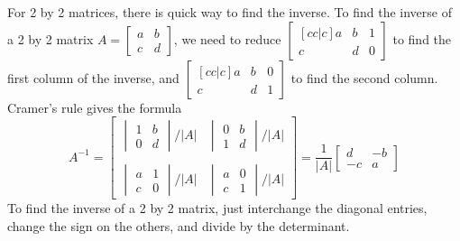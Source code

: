 For 2 by 2 matrices, there is quick way to find the inverse. 
To find the inverse of a 2 by 2 matrix $A=\begin{bmatrix}a&b\\c&d\end{bmatrix}$, we need to reduce $\begin{bmatrix}[cc|c]a&b&1\\c&d&0\end{bmatrix}$ to find the first column of the inverse, and $\begin{bmatrix}[cc|c]a&b&0\\c&d&1\end{bmatrix}$ to find the second column.  
Cramer's rule gives the formula 
$$A^{-1}=
\begin{bmatrix}
\begin{vmatrix}1&b\\0&d\end{vmatrix}/|A|&\begin{vmatrix}0&b\\1&d\end{vmatrix}/|A|\\ \\
\begin{vmatrix}a&1\\c&0\end{vmatrix}/|A|&\begin{vmatrix}a&0\\c&1\end{vmatrix}/|A|\end{bmatrix} 
= \frac{1}{|A|}
\begin{bmatrix}d&-b\\-c&a\end{bmatrix}
$$
To find the inverse of a 2 by 2 matrix, just interchange the diagonal entries, change the sign on the others, and divide by the determinant.

